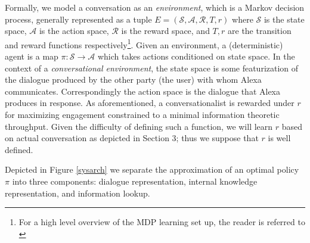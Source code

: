 \documentclass{article} %
\theoremstyle{named}
\def\scripta{{\mathcal A}}
\def\scriptr{{\mathcal R}}
\def\scripts{{\mathcal S}}
\begin{document}
Formally, we model a conversation as an \emph{environment}, which is a Markov decision process, generally represented as a tuple $ E = (\scripts, \scripta, \scriptr, T, r)$ where $ \scripts $ is the state space, $ \scripta $ is the action space, $ \scriptr $ is the reward space, and $ T, r $ are the transition and reward functions respectively\footnote{For a high level overview of the MDP learning set up, the reader is referred to \cite{Bel}}. Given an environment, a (deterministic) agent is a map $ \pi: \scripts \to \scripta $ which takes actions conditioned on state space. In the context of a \emph{conversational environment}, the state space is some featurization of the dialogue produced by the other party (the user) with whom Alexa communicates. Correspondingly the action space is the dialogue that Alexa produces in response. As aforementioned, a conversationalist is rewarded under $ r $ for maximizing engagement constrained to a minimal information theoretic throughput. Given the difficulty of defining such a function, we will learn $ r $ based on actual conversation as depicted in Section 3; thus we suppose that $ r $ is well defined.

Depicted in Figure \ref{sysarch} we separate the approximation of an optimal policy $ \pi $ into three components: dialogue representation, internal knowledge representation, and information lookup.
\end{document}
